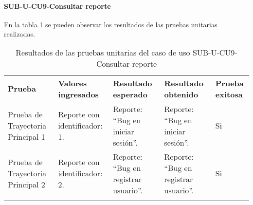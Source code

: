 \paragraph{SUB-U-CU9-Consultar reporte}\label{SUB-U-CU9:Pruebas}
En la tabla \ref{pruebas_unitarias_sub-u-cu9} se pueden observar los resultados de las pruebas unitarias realizadas.
\begin{longtable}{|M{2cm}| M{4.5cm}|M{3cm}|M{3cm}|M{1.5cm}|}
	\hline
	\textbf{Prueba} & \textbf{Valores ingresados} & \textbf{Resultado esperado} & \textbf{Resultado obtenido} & \textbf{Prueba exitosa} \\ \hline
	Prueba de Trayectoria Principal 1 & Reporte con identificador: 1.
	& 
	Reporte: ``Bug en iniciar sesión''.
	&
	Reporte: ``Bug en iniciar sesión''.
	& Si \\ \hline

	Prueba de Trayectoria Principal 2 & Reporte con identificador: 2.
	& 
	Reporte: ``Bug en registrar usuario''.
	&
	Reporte: ``Bug en registrar usuario''.
	& Si \\ \hline

	\caption{Resultados de las pruebas unitarias del caso de uso SUB-U-CU9-Consultar reporte}
	\label{pruebas_unitarias_sub-u-cu9}
\end{longtable}